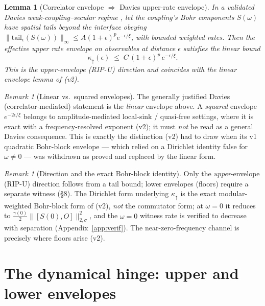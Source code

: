 \documentclass[11pt,a4paper]{article}
\theoremstyle{plain}
\newtheorem{lemma}[theorem]{Lemma}
\theoremstyle{definition}
\theoremstyle{remark}
\newtheorem{remark}[theorem]{Remark}
\newcommand{\eps}{\epsilon}
\newcommand{\kup}{\kappa_{\uparrow}}
\begin{document}
\begin{lemma}[Correlator envelope $\Rightarrow$ Davies upper-rate envelope]
\label{lem:davies}
In a validated Davies weak-coupling--secular regime \cite{Davies74,BreuerPetruccione},
let the coupling's Bohr components $S(\omega)$ have spatial tails beyond the
interface obeying $\|\mathrm{tail}_\eps(S(\omega))\|_\infty \le
A(1+\eps)^p e^{-\eps/\xi}$, with bounded weighted rates. Then the effective \emph{upper} rate envelope on observables at distance
$\eps$ satisfies the \emph{linear} bound
\begin{equation}
\kup(\eps) \;\le\; C\,(1+\eps)^p\, e^{-\eps/\xi}.
\end{equation}
This is the upper-envelope (RIP-U) direction and coincides with the
\emph{linear} envelope lemma of \cite{DaviesCore} (v2).
\end{lemma}

\begin{remark}[Linear vs.\ squared envelopes]\label{rem:linsq}
The generally justified Davies (correlator-mediated) statement is the
\emph{linear} envelope above. A \emph{squared} envelope
$e^{-2\eps/\xi}$ belongs to amplitude-mediated local-sink / quasi-free
settings, where it is exact with a frequency-resolved exponent
\cite{HCut} (v2); it must \emph{not} be read as a general Davies
consequence. This is exactly the distinction \cite{DaviesCore} (v2) had to
draw when its v1 quadratic Bohr-block envelope --- which relied on a
Dirichlet identity false for $\omega \neq 0$ --- was withdrawn as proved and
replaced by the linear form.
\end{remark}

\begin{remark}[Direction and the exact Bohr-block identity]
Only the \emph{upper}-envelope (RIP-U) direction follows from a tail bound;
lower envelopes (floors) require a separate witness (\S8). The Dirichlet form
underlying $\kup$ is the exact modular-weighted Bohr-block form of
\cite{DaviesCore} (v2), \emph{not} the commutator form; at $\omega = 0$ it
reduces to $\tfrac{\gamma(0)}{2}\|[S(0),O]\|^2_{2,\sigma}$, and the
$\omega = 0$ witness rate is verified to decrease with separation
(Appendix~\ref{app:verif}). The near-zero-frequency channel is precisely
where floors arise \cite{Stress} (v2).
\end{remark}

\section{The dynamical hinge: upper and lower envelopes}
\end{document}
